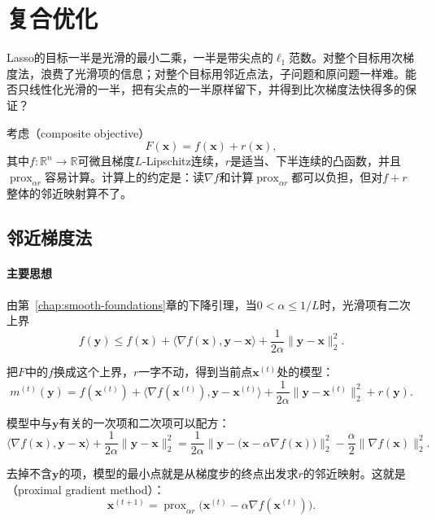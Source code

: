 \section{复合优化}
\label{sec:ns-composite}

Lasso的目标一半是光滑的最小二乘，一半是带尖点的$\ell_1$范数。对整个目标用次梯度法，浪费了光滑项的信息；对整个目标用邻近点法，子问题和原问题一样难。能否只线性化光滑的一半，把有尖点的一半原样留下，并得到比次梯度法快得多的保证？

考虑（composite objective）
\begin{equation}
 F(\bm{x})=f(\bm{x})+r(\bm{x}),
 \label{eq:ns-composite}
\end{equation}
其中$f:\mathbb{R}^n\to\mathbb{R}$可微且梯度$L$-Lipschitz连续，$r$是适当、下半连续的凸函数，并且$\operatorname{prox}_{\alpha r}$容易计算。计算上的约定是：读$\nabla f$和计算$\operatorname{prox}_{\alpha r}$都可以负担，但对$f+r$整体的邻近映射算不了。

\subsection{邻近梯度法}
\label{sec:ns-proximal-gradient}

\paragraph{主要思想}
由第~\ref{chap:smooth-foundations}章的下降引理，当$0<\alpha\leq1/L$时，光滑项有二次上界
\[
 f(\bm{y})\leq f(\bm{x})+\langle\nabla f(\bm{x}),\bm{y}-\bm{x}\rangle+\frac{1}{2\alpha}\lVert\bm{y}-\bm{x}\rVert_2^2.
\]

把$F$中的$f$换成这个上界，$r$一字不动，得到当前点$\bm{x}^{(t)}$处的模型：
\begin{equation}
 m^{(t)}(\bm{y})=f(\bm{x}^{(t)})+\langle\nabla f(\bm{x}^{(t)}),\bm{y}-\bm{x}^{(t)}\rangle+\frac{1}{2\alpha}\lVert\bm{y}-\bm{x}^{(t)}\rVert_2^2+r(\bm{y}).
 \label{eq:ns-composite-model}
\end{equation}

模型中与$\bm{y}$有关的一次项和二次项可以配方：
\[
 \langle\nabla f(\bm{x}),\bm{y}-\bm{x}\rangle+\frac{1}{2\alpha}\lVert\bm{y}-\bm{x}\rVert_2^2
 =\frac{1}{2\alpha}\bigl\lVert\bm{y}-\bigl(\bm{x}-\alpha\nabla f(\bm{x})\bigr)\bigr\rVert_2^2-\frac{\alpha}{2}\lVert\nabla f(\bm{x})\rVert_2^2.
\]

去掉不含$\bm{y}$的项，模型的最小点就是从梯度步的终点出发求$r$的邻近映射。这就是（proximal gradient method）：
\begin{equation}
 \bm{x}^{(t+1)}=\operatorname{prox}_{\alpha r}\bigl(\bm{x}^{(t)}-\alpha\nabla f(\bm{x}^{(t)})\bigr).
 \label{eq:ns-prox-grad}
\end{equation}

